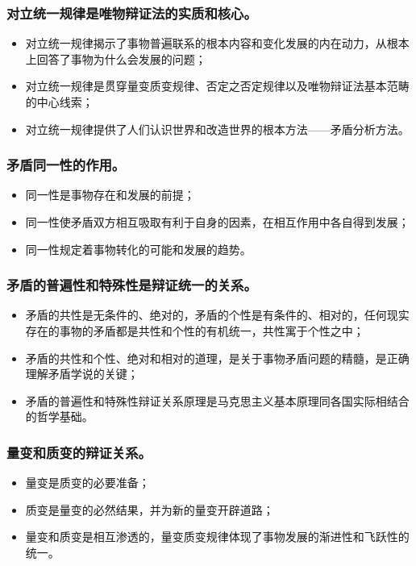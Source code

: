 \documentclass{article}
\begin{document}
\subsubsection{对立统一规律是唯物辩证法的实质和核心。}
\begin{itemize}
    \item 对立统一规律揭示了事物普遍联系的根本内容和变化发展的内在动力，从根本上回答了事物为什么会发展的问题；
    \item 对立统一规律是贯穿量变质变规律、否定之否定规律以及唯物辩证法基本范畴的中心线索；
    \item 对立统一规律提供了人们认识世界和改造世界的根本方法——矛盾分析方法。
\end{itemize}

\subsubsection{矛盾同一性的作用。}
\begin{itemize}
    \item 同一性是事物存在和发展的前提；
    \item 同一性使矛盾双方相互吸取有利于自身的因素，在相互作用中各自得到发展；
    \item 同一性规定着事物转化的可能和发展的趋势。
\end{itemize}

\subsubsection{矛盾的普遍性和特殊性是辩证统一的关系。}
\begin{itemize}
    \item 矛盾的共性是无条件的、绝对的，矛盾的个性是有条件的、相对的，任何现实存在的事物的矛盾都是共性和个性的有机统一，共性寓于个性之中；
    \item 矛盾的共性和个性、绝对和相对的道理，是关于事物矛盾问题的精髓，是正确理解矛盾学说的关键；
    \item 矛盾的普遍性和特殊性辩证关系原理是马克思主义基本原理同各国实际相结合的哲学基础。
\end{itemize}

\subsubsection{量变和质变的辩证关系。}
\begin{itemize}
    \item 量变是质变的必要准备；
    \item 质变是量变的必然结果，并为新的量变开辟道路；
    \item 量变和质变是相互渗透的，量变质变规律体现了事物发展的渐进性和飞跃性的统一。
\end{itemize}
\end{document}
